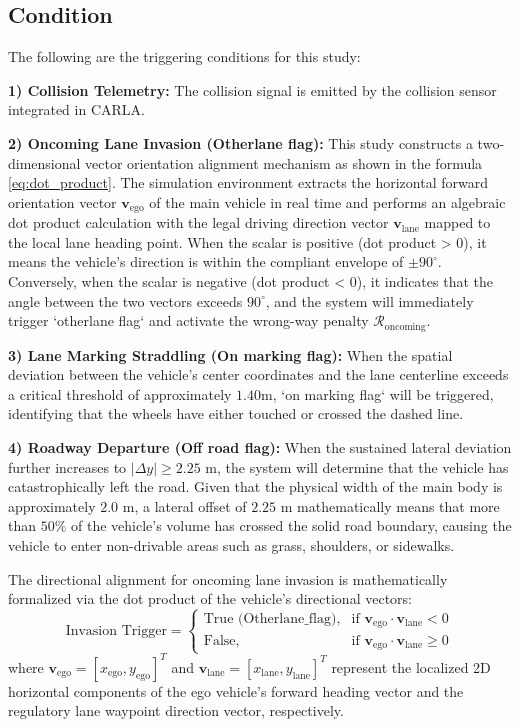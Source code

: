     \subsection{Condition}
    The following are the triggering conditions for this study:

    \textbf{1) Collision Telemetry:} The collision signal is emitted by the collision sensor integrated in CARLA.

    \textbf{2) Oncoming Lane Invasion (Otherlane flag):} This study constructs a two-dimensional vector orientation alignment mechanism as shown in the formula \ref{eq:dot_product}. The simulation environment extracts the horizontal forward orientation vector $\mathbf{v}_{\text{ego}}$ of the main vehicle in real time and performs an algebraic dot product calculation with the legal driving direction vector $\mathbf{v}_{\text{lane}}$ mapped to the local lane heading point. When the scalar is positive (dot product > 0), it means the vehicle's direction is within the compliant envelope of $\pm 90^{\circ}$. Conversely, when the scalar is negative (dot product < 0), it indicates that the angle between the two vectors exceeds $90^{\circ}$, and the system will immediately trigger `otherlane flag` and activate the wrong-way penalty $\mathcal{R}_{\text{oncoming}}$.

    \textbf{3) Lane Marking Straddling (On marking flag):} When the spatial deviation between the vehicle's center coordinates and the lane centerline exceeds a critical threshold of approximately $1.40 \text{m}$, `on marking flag` will be triggered, identifying that the wheels have either touched or crossed the dashed line.

    \textbf{4) Roadway Departure (Off road flag):} When the sustained lateral deviation further increases to $\vert \Delta y \vert \ge 2.25 \text{ m}$, the system will determine that the vehicle has catastrophically left the road. Given that the physical width of the main body is approximately $2.0 \text{ m}$, a lateral offset of $2.25 \text{ m}$ mathematically means that more than $50\%$ of the vehicle's volume has crossed the solid road boundary, causing the vehicle to enter non-drivable areas such as grass, shoulders, or sidewalks.

    The directional alignment for oncoming lane invasion is mathematically formalized via the dot product of the vehicle's directional vectors:
    \begin{equation}
        \text{Invasion Trigger} = 
        \begin{cases} 
          \text{True (Otherlane\_flag)}, & \text{if } \mathbf{v}_{\text{ego}} \cdot \mathbf{v}_{\text{lane}} < 0 \\
          \text{False}, & \text{if } \mathbf{v}_{\text{ego}} \cdot \mathbf{v}_{\text{lane}} \ge 0
       \end{cases}
       \label{eq:dot_product}
    \end{equation}
    where $\mathbf{v}_{\text{ego}} = [x_{\text{ego}}, y_{\text{ego}}]^T$ and $\mathbf{v}_{\text{lane}} = [x_{\text{lane}}, y_{\text{lane}}]^T$ represent the localized 2D horizontal components of the ego vehicle's forward heading vector and the regulatory lane waypoint direction vector, respectively.
    
